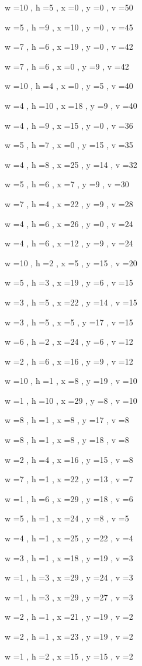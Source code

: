 \documentclass[11pt]{article}
\begin{document}
w =10 , h =5 , x =0 , y =0 , v =50
\par
w =5 , h =9 , x =10 , y =0 , v =45
\par
w =7 , h =6 , x =19 , y =0 , v =42
\par
w =7 , h =6 , x =0 , y =9 , v =42
\par
w =10 , h =4 , x =0 , y =5 , v =40
\par
w =4 , h =10 , x =18 , y =9 , v =40
\par
w =4 , h =9 , x =15 , y =0 , v =36
\par
w =5 , h =7 , x =0 , y =15 , v =35
\par
w =4 , h =8 , x =25 , y =14 , v =32
\par
w =5 , h =6 , x =7 , y =9 , v =30
\par
w =7 , h =4 , x =22 , y =9 , v =28
\par
w =4 , h =6 , x =26 , y =0 , v =24
\par
w =4 , h =6 , x =12 , y =9 , v =24
\par
w =10 , h =2 , x =5 , y =15 , v =20
\par
w =5 , h =3 , x =19 , y =6 , v =15
\par
w =3 , h =5 , x =22 , y =14 , v =15
\par
w =3 , h =5 , x =5 , y =17 , v =15
\par
w =6 , h =2 , x =24 , y =6 , v =12
\par
w =2 , h =6 , x =16 , y =9 , v =12
\par
w =10 , h =1 , x =8 , y =19 , v =10
\par
w =1 , h =10 , x =29 , y =8 , v =10
\par
w =8 , h =1 , x =8 , y =17 , v =8
\par
w =8 , h =1 , x =8 , y =18 , v =8
\par
w =2 , h =4 , x =16 , y =15 , v =8
\par
w =7 , h =1 , x =22 , y =13 , v =7
\par
w =1 , h =6 , x =29 , y =18 , v =6
\par
w =5 , h =1 , x =24 , y =8 , v =5
\par
w =4 , h =1 , x =25 , y =22 , v =4
\par
w =3 , h =1 , x =18 , y =19 , v =3
\par
w =1 , h =3 , x =29 , y =24 , v =3
\par
w =1 , h =3 , x =29 , y =27 , v =3
\par
w =2 , h =1 , x =21 , y =19 , v =2
\par
w =2 , h =1 , x =23 , y =19 , v =2
\par
w =1 , h =2 , x =15 , y =15 , v =2
\par
\newpage
\end{document}
